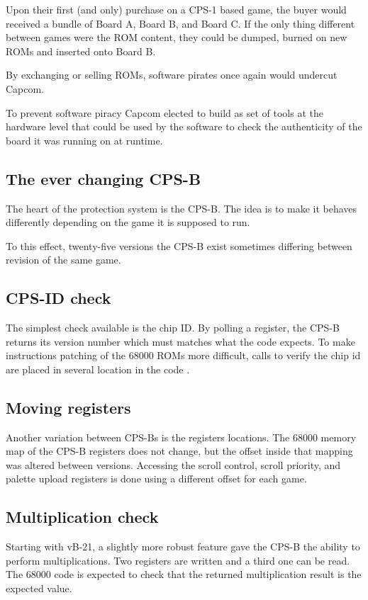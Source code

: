 Upon their first (and only) purchase on a CPS-1 based game, the buyer would received a bundle of Board A, Board B, and Board C. If the only thing different between games were the ROM content, they could be dumped, burned on new ROMs and inserted onto Board B. 

By exchanging or selling ROMs, software pirates once again would undercut Capcom.

To prevent software piracy Capcom elected to build as set of tools at the hardware level that could be used by the software to check the authenticity of the board it was running on at runtime.



\subsection{The ever changing CPS-B}
The heart of the protection system is the CPS-B. The idea is to make it behaves differently depending on the game it is supposed to run.

To this effect, twenty-five versions the CPS-B exist\cite{mame_cps1_video} sometimes differing between revision of the same game\cite{cpsBNumbers}.



\subsection{CPS-ID check}
The simplest check available is the chip ID. By polling a register, the CPS-B returns its version number which must matches what the code expects. To make instructions patching of the 68000 ROMs more difficult, calls to verify the chip id are placed in several location in the code .

\subsection{Moving registers}
Another variation between CPS-Bs is the registers locations. The 68000 memory map of the CPS-B registers does not change, but the offset inside that mapping was altered between versions. Accessing the scroll control, scroll priority, and palette upload registers is done using a different offset for each game.


\subsection{Multiplication check}
Starting with vB-21, a slightly more robust feature gave the CPS-B the ability to perform multiplications. Two registers are written and a third one can be read. The 68000 code is expected to check that the returned multiplication result is the expected value.


